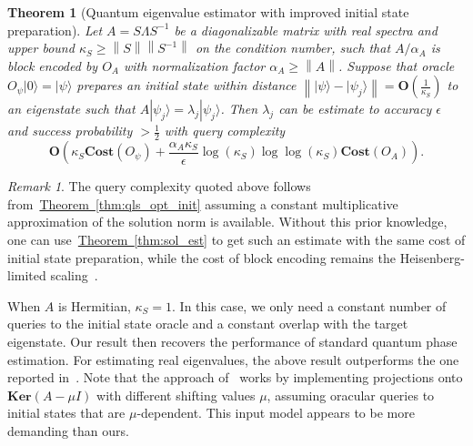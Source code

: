 \documentclass[letterpaper,onecolumn,11pt,accepted=2026-02-14]{quantumarticle}
\newcommand{\norm}[1]{\left\lVert#1\right\rVert}
\newtheorem{theorem}{Theorem}
\theoremstyle{remark}
\newtheorem*{remark}{Remark}
\theoremstyle{plain}
\newcommand{\thm}[1]{\hyperref[thm:#1]{Theorem~\ref*{thm:#1}}}
\newcommand{\ket}[1]{|#1\rangle}
\begin{document}
\begin{theorem}[Quantum eigenvalue estimator with improved initial state preparation]
\label{thm:qeve_init}
Let $A=S\Lambda S^{-1}$ be a diagonalizable matrix with real spectra and upper bound $\kappa_S\geq\norm{S}\norm{S^{-1}}$ on the condition number, such that $A/\alpha_A$ is block encoded by $O_A$ with normalization factor $\alpha_A\geq\norm{A}$.
Suppose that oracle $O_\psi\ket{0}=\ket{\psi}$ prepares an initial state within distance $\norm{\ket{\psi}-\ket{\psi_j}}=\mathbf{O}\left(\frac{1}{\kappa_S}\right)$ to an eigenstate such that $A\ket{\psi_{j}}=\lambda_j\ket{\psi_{j}}$. Then $\lambda_j$ can be estimate to accuracy $\epsilon$ and success probability $>\frac{1}{2}$ with query complexity
\begin{equation}
    \mathbf{O}\left(\kappa_S
    \mathbf{Cost}\left(O_{\psi}\right)
    +\frac{\alpha_A\kappa_S}{\epsilon}
    \log\left(\kappa_S\right)
    \log\log\left(\kappa_S\right)
    \mathbf{Cost}\left(O_A\right)\right).
\end{equation}
\end{theorem}
\begin{remark}
The query complexity quoted above follows from~\thm{qls_opt_init} assuming a constant multiplicative approximation of the solution norm is available. Without this prior knowledge, one can use~\thm{sol_est} to get such an estimate with the same cost of initial state preparation, while the cost of block encoding remains the Heisenberg-limited scaling~\cite{Giovannetti06,Zwierz10}.

When $A$ is Hermitian, $\kappa_S=1$. In this case, we only need a constant number of queries to the initial state oracle and a constant overlap with the target eigenstate. Our result then recovers the performance of standard quantum phase estimation. For estimating real eigenvalues, the above result outperforms the one reported in~\cite{Zhang2024Nonnormal}. Note that the approach of~\cite{Zhang2024Nonnormal} works by implementing projections onto $\mathbf{Ker}(A-\mu I)$ with different shifting values $\mu$, assuming oracular queries to initial states that are $\mu$-dependent. This input model appears to be more demanding than ours.
\end{remark}

\end{document}
